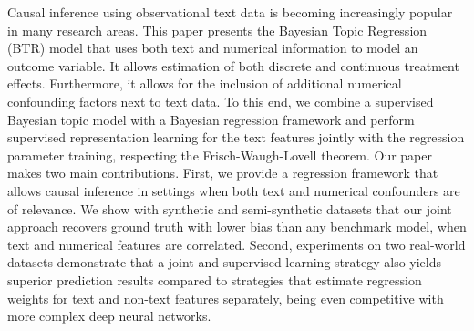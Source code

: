 Causal inference using observational text data is becoming increasingly popular in many research areas.  This paper presents the Bayesian Topic Regression (BTR) model that uses both text and numerical information to model an outcome variable. It allows estimation of both discrete and continuous treatment effects. Furthermore, it allows for the inclusion of additional numerical confounding factors next to text data. To this end, we combine a supervised Bayesian topic model with a Bayesian regression framework and perform supervised representation learning for the text features jointly with the regression parameter training, respecting the Frisch-Waugh-Lovell theorem. Our paper makes two main contributions. First, we provide a regression framework that allows causal inference in settings when both text and numerical confounders are of relevance. We show with synthetic and semi-synthetic datasets that our joint approach recovers ground truth with lower bias than any benchmark model, when text and numerical features are correlated. Second, experiments on two real-world datasets demonstrate that a joint and supervised learning strategy also yields superior prediction results compared to strategies that estimate regression weights for text and non-text features separately, being even competitive with more complex deep neural networks.

